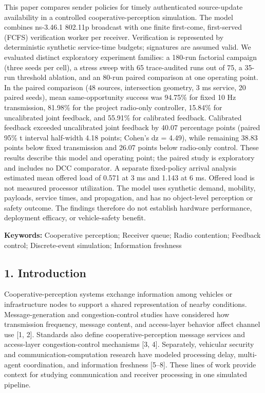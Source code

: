 \documentclass[
]{article}
\begin{document}
This paper compares sender policies for timely authenticated
source-update availability in a controlled cooperative-perception
simulation. The model combines ns-3.46.1 802.11p broadcast with one
finite first-come, first-served (FCFS) verification worker per receiver.
Verification is represented by deterministic synthetic service-time
budgets; signatures are assumed valid. We evaluated distinct exploratory
experiment families: a 180-run factorial campaign (three seeds per
cell), a stress sweep with 65 trace-audited runs out of 75, a 35-run
threshold ablation, and an 80-run paired comparison at one operating
point. In the paired comparison (48 sources, intersection geometry, 3 ms
service, 20 paired seeds), mean same-opportunity success was 94.75\% for
fixed 10 Hz transmission, 81.98\% for the project radio-only controller,
15.84\% for uncalibrated joint feedback, and 55.91\% for calibrated
feedback. Calibrated feedback exceeded uncalibrated joint feedback by
40.07 percentage points (paired 95\% t interval half-width 4.18 points;
Cohen's dz = 4.49), while remaining 38.83 points below fixed
transmission and 26.07 points below radio-only control. These results
describe this model and operating point; the paired study is exploratory
and includes no DCC comparator. A separate fixed-policy arrival analysis
estimated mean offered load of 0.571 at 3 ms and 1.143 at 6 ms. Offered
load is not measured processor utilization. The model uses synthetic
demand, mobility, payloads, service times, and propagation, and has no
object-level perception or safety outcome. The findings therefore do not
establish hardware performance, deployment efficacy, or vehicle-safety
benefit.

\textbf{Keywords:} Cooperative perception; Receiver queue; Radio
contention; Feedback control; Discrete-event simulation; Information
freshness

\subsection{1. Introduction}\label{introduction}

Cooperative-perception systems exchange information among vehicles or
infrastructure nodes to support a shared representation of nearby
conditions. Message-generation and congestion-control studies have
considered how transmission frequency, message content, and access-layer
behavior affect channel use {[}1, 2{]}. Standards also define
cooperative-perception message services and access-layer
congestion-control mechanisms {[}3, 4{]}. Separately, vehicular security
and communication-computation research have modeled processing delay,
multi-agent coordination, and information freshness {[}5--8{]}. These
lines of work provide context for studying communication and receiver
processing in one simulated pipeline.
\end{document}
